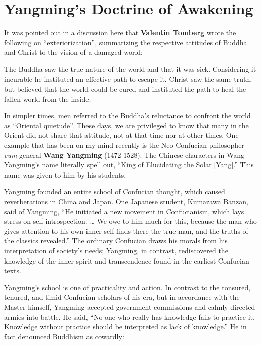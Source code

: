 \section{Yangming's Doctrine of Awakening}

It was pointed out in a discussion here that \textbf{Valentin Tomberg} wrote the following on “exteriorization”, summarizing the respective attitudes of Buddha and Christ to the vision of a damaged world:

\begin{quotex}
The Buddha saw the true nature of the world and that it was sick. Considering it incurable he instituted an effective path to escape it. Christ saw the same truth, but believed that the world could be cured and instituted the path to heal the fallen world from the inside.

\end{quotex}
In simpler times, men referred to the Buddha's reluctance to confront the world as “Oriental quietude”. These days, we are privileged to know that many in the Orient did not share that attitude, not at that time nor at other times. One example that has been on my mind recently is the Neo-Confucian philosopher-\emph{cum}-general \textbf{Wang Yangming} (1472-1528). The Chinese characters in Wang Yangming's name literally spell out, “King of Elucidating the Solar [Yang].” This name was given to him by his students.

Yangming founded an entire school of Confucian thought, which caused reverberations in China and Japan. One Japanese student, Kumazawa Banzan, said of Yangming, “He initiated a new movement in Confucianism, which lays stress on self-introspection. … We owe to him much for this, because the man who gives attention to his own inner self finds there the true man, and the truths of the classics revealed.” The ordinary Confucian draws his morals from his interpretation of society's needs; Yangming, in contrast, rediscovered the knowledge of the inner spirit and transcendence found in the earliest Confucian texts.

Yangming's school is one of practicality and action. In contrast to the tonsured, tenured, and timid Confucian scholars of his era, but in accordance with the Master himself, Yangming accepted government commissions and calmly directed armies into battle. He said, “No one who really has knowledge fails to practice it. Knowledge without practice should be interpreted as lack of knowledge.” He in fact denounced Buddhism as cowardly:


